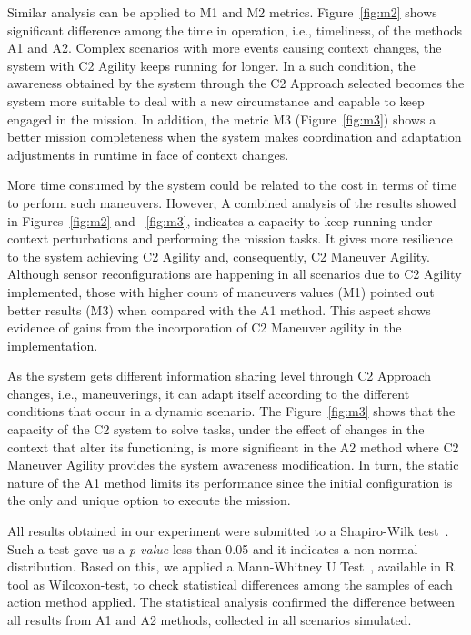 Similar analysis can be applied to M1 and M2 metrics. Figure~\ref{fig:m2} shows significant difference among the time in operation, i.e., timeliness, of the methods A1 and A2. Complex scenarios with more events causing context changes, the system with C2 Agility keeps running for longer. In a such condition, the awareness obtained by the system through the C2 Approach selected becomes the system more suitable to deal with a new circumstance and capable to keep engaged in the mission. In addition, the metric M3 (Figure~\ref{fig:m3}) shows a better mission completeness when the system makes coordination and adaptation adjustments in runtime in face of context changes. 

More time consumed by the system could be related to the cost in terms of time to perform such maneuvers. However, A combined analysis of the results showed in Figures~\ref{fig:m2} and ~\ref{fig:m3}, indicates a capacity to keep running under context perturbations and performing the mission tasks. It gives more resilience to the system achieving C2 Agility and, consequently, C2 Maneuver Agility. Although sensor reconfigurations are happening in all scenarios due to C2 Agility implemented, those with higher count of maneuvers values (M1) pointed out better results (M3) when compared with the A1 method. This aspect shows evidence of gains from the incorporation of C2 Maneuver agility in the implementation.

As the system gets different information sharing level through C2 Approach changes, i.e., maneuverings, it can adapt itself according to the different conditions that occur in a dynamic scenario. The Figure~\ref{fig:m3} shows that the capacity of the C2 system to solve tasks, under the effect of changes in the context that alter its functioning, is more significant in the A2 method where C2 Maneuver Agility provides the system awareness modification. In turn, the static nature of the A1 method limits its performance since the initial configuration is the only and unique option to execute the mission.

All results obtained in our experiment were submitted to a Shapiro-Wilk test~\citep{stat001}. Such a test gave us a \textit{p-value} less than 0.05 and it indicates a non-normal distribution. Based on this, we applied a Mann-Whitney U Test~\citep{stat002}, available in R tool as Wilcoxon-test, to check statistical differences among the samples of each action method applied. The statistical analysis confirmed the difference between all results from A1 and A2 methods, collected in all scenarios simulated.


